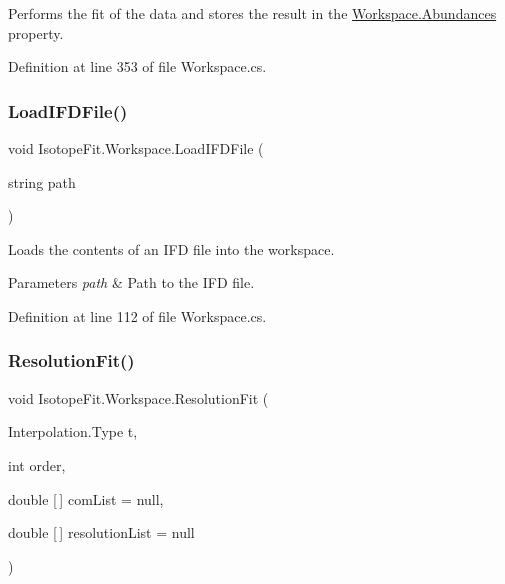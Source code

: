 Performs the fit of the data and stores the result in the \hyperlink{class_isotope_fit_1_1_workspace_a0ddbe91c8ebc52ce13212b3fe8a52408}{Workspace.\+Abundances} property. 



Definition at line 353 of file Workspace.\+cs.

\mbox{\label{class_isotope_fit_1_1_workspace_a55061c1f05d3e02d2d591fe6211d2f1f}} 
\subsubsection{\texorpdfstring{Load\+I\+F\+D\+File()}{LoadIFDFile()}}
{\footnotesize\ttfamily void Isotope\+Fit.\+Workspace.\+Load\+I\+F\+D\+File (\begin{DoxyParamCaption}\item[{string}]{path }\end{DoxyParamCaption})}



Loads the contents of an I\+FD file into the workspace. 


\begin{DoxyParams}{Parameters}
{\em path} & Path to the I\+FD file.\\
\hline
\end{DoxyParams}


Definition at line 112 of file Workspace.\+cs.

\mbox{\label{class_isotope_fit_1_1_workspace_a00c1ae2e3b1d443808bef150a1e99410}} 
\subsubsection{\texorpdfstring{Resolution\+Fit()}{ResolutionFit()}}
{\footnotesize\ttfamily void Isotope\+Fit.\+Workspace.\+Resolution\+Fit (\begin{DoxyParamCaption}\item[{Interpolation.\+Type}]{t,  }\item[{int}]{order,  }\item[{double \mbox{[}$\,$\mbox{]}}]{com\+List = {\ttfamily null},  }\item[{double \mbox{[}$\,$\mbox{]}}]{resolution\+List = {\ttfamily null} }\end{DoxyParamCaption})}



